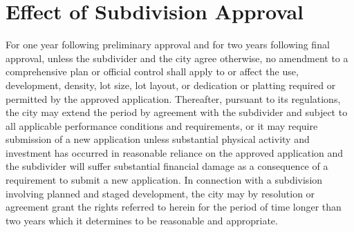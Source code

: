 \section{Effect of Subdivision Approval}
For one year following preliminary approval and for two years following final approval, unless the subdivider and the city agree otherwise, no amendment to a comprehensive plan or official control shall apply to or affect the use, development, density, lot size, lot layout, or dedication or platting required or permitted by the approved application. Thereafter, pursuant to its regulations, the city may extend the period by agreement with the subdivider and subject to all applicable performance conditions and requirements, or it may require submission of a new application unless substantial physical activity and investment has occurred in reasonable reliance on the approved application and the subdivider will suffer substantial financial damage as a consequence of a requirement to submit a new application. In connection with a subdivision involving planned and staged development, the city may by resolution or agreement grant the rights referred to herein for the period of time longer than two years which it determines to be reasonable and appropriate.

